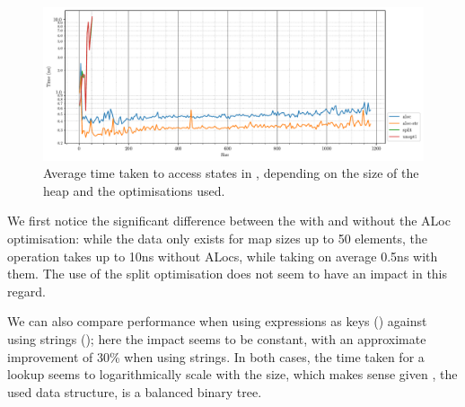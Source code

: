 \begin{figure}
	\centering
	\includegraphics[width=13cm]{figures/pmap_time_per_size.pdf}
	\caption{Average time taken to access states in \PMap, depending on the size of the heap and the optimisations used.}
	\label{fig:pmap-perf}
\end{figure}

We first notice the significant difference between the \PMap{} with and without the ALoc optimisation: while the data only exists for map sizes up to 50 elements, the operation takes up to 10ns without ALocs, while taking on average 0.5ns with them. The use of the split optimisation does not seem to have an impact in this regard.

We can also compare performance when using expressions as keys () against using strings (); here the impact seems to be constant, with an approximate improvement of 30\% when using strings. In both cases, the time taken for a lookup seems to logarithmically scale with the size, which makes sense given , the used data structure, is a balanced binary tree.
